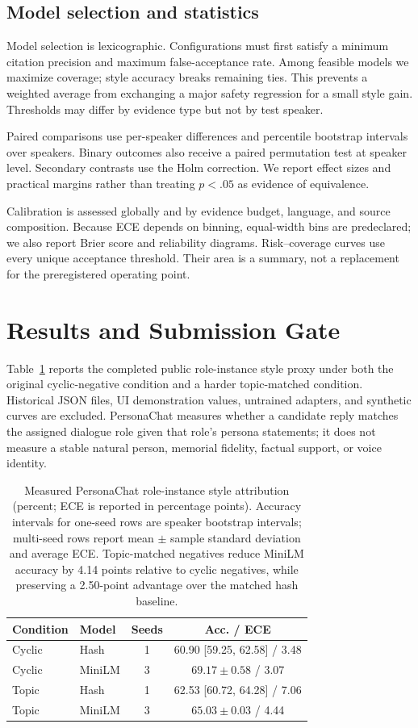 \documentclass[11pt,a4paper]{article}
\begin{document}
\subsection{Model selection and statistics}

Model selection is lexicographic.  Configurations must first satisfy a minimum
citation precision and maximum false-acceptance rate.  Among feasible models we
maximize coverage; style accuracy breaks remaining ties.  This prevents a
weighted average from exchanging a major safety regression for a small style
gain.  Thresholds may differ by evidence type but not by test speaker.

Paired comparisons use per-speaker differences and percentile bootstrap
intervals over speakers.  Binary outcomes also receive a paired permutation
test at speaker level.  Secondary contrasts use the Holm correction.  We report
effect sizes and practical margins rather than treating $p<.05$ as evidence of
equivalence.

Calibration is assessed globally and by evidence budget, language, and source
composition.  Because ECE depends on binning, equal-width bins are predeclared;
we also report Brier score and reliability diagrams.  Risk--coverage curves use
every unique acceptance threshold.  Their area is a summary, not a replacement
for the preregistered operating point.

\section{Results and Submission Gate}

Table~\ref{tab:results} reports the completed public role-instance style proxy
under both the original cyclic-negative condition and a harder topic-matched
condition.  Historical JSON files, UI demonstration values, untrained adapters,
and synthetic curves are excluded.
PersonaChat measures whether a candidate reply
matches the assigned dialogue role given that role's persona statements; it
does not measure a stable natural person, memorial fidelity, factual support,
or voice identity.

\begin{table}[t]
\centering
\scriptsize
\begin{tabular}{llcc}
\toprule
Condition & Model & Seeds & Acc. / ECE \\
\midrule
Cyclic & Hash & 1 & 60.90 [59.25, 62.58] / 3.48 \\
Cyclic & MiniLM & 3 & $69.17\pm0.58$ / 3.07 \\
Topic & Hash & 1 & 62.53 [60.72, 64.28] / 7.06 \\
Topic & MiniLM & 3 & $65.03\pm0.03$ / 4.44 \\
\bottomrule
\end{tabular}
\caption{Measured PersonaChat role-instance style attribution (percent; ECE is
reported in percentage points).  Accuracy intervals for one-seed rows are
speaker bootstrap intervals; multi-seed rows report mean $\pm$ sample standard
deviation and average ECE.  Topic-matched negatives reduce MiniLM accuracy by
4.14 points relative to cyclic negatives, while preserving a 2.50-point
advantage over the matched hash baseline.}
\label{tab:results}
\end{table}
\end{document}
